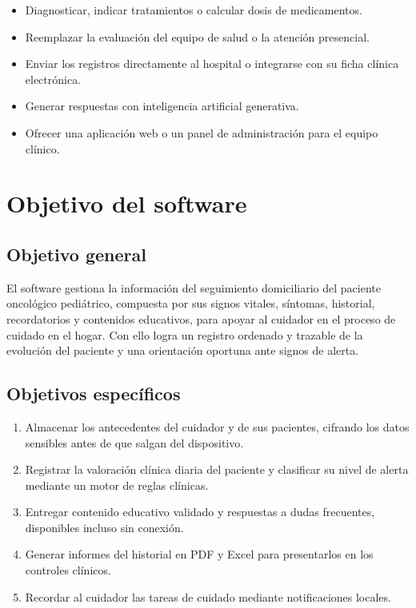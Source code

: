 \begin{itemize}
    \item Diagnosticar, indicar tratamientos o calcular dosis de medicamentos.
    \item Reemplazar la evaluación del equipo de salud o la atención presencial.
    \item Enviar los registros directamente al hospital o integrarse con su ficha
    clínica electrónica.
    \item Generar respuestas con inteligencia artificial generativa.
    \item Ofrecer una aplicación web o un panel de administración para el equipo
    clínico.
\end{itemize}

\section[Objetivo del Software]{Objetivo del software}

\subsection{Objetivo general}

El software gestiona la información del seguimiento domiciliario del paciente
oncológico pediátrico, compuesta por sus signos vitales, síntomas, historial,
recordatorios y contenidos educativos, para apoyar al cuidador en el proceso de
cuidado en el hogar. Con ello logra un registro ordenado y trazable de la
evolución del paciente y una orientación oportuna ante signos de alerta.

\subsection{Objetivos específicos}

\begin{enumerate}
    \item Almacenar los antecedentes del cuidador y de sus pacientes, cifrando
    los datos sensibles antes de que salgan del dispositivo.
    \item Registrar la valoración clínica diaria del paciente y clasificar su
    nivel de alerta mediante un motor de reglas clínicas.
    \item Entregar contenido educativo validado y respuestas a dudas frecuentes,
    disponibles incluso sin conexión.
    \item Generar informes del historial en PDF y Excel para presentarlos en los
    controles clínicos.
    \item Recordar al cuidador las tareas de cuidado mediante notificaciones
    locales.
\end{enumerate}

